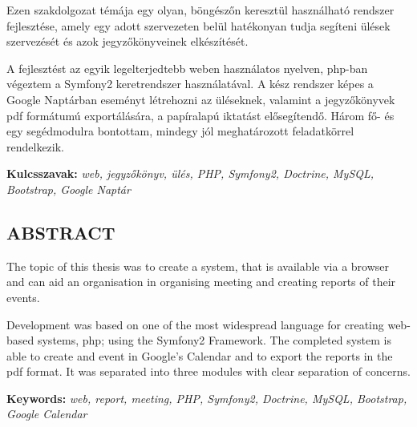 \documentclass[a4paper,12pt,oneside]{report}
\begin{document}
Ezen szakdolgozat témája egy olyan, böngészőn keresztül használható rendszer fejlesztése, amely egy adott szervezeten belül hatékonyan tudja segíteni ülések szervezését és azok jegyzőkönyveinek elkészítését.

A fejlesztést az egyik legelterjedtebb weben használatos nyelven, php-ban végeztem a Symfony2 keretrendszer használatával. A kész rendszer képes a Google Naptárban eseményt létrehozni az üléseknek, valamint a jegyzőkönyvek pdf formátumú exportálására, a papíralapú iktatást elősegítendő. Három fő- és egy segédmodulra bontottam, mindegy jól meghatározott feladatkörrel rendelkezik.

\vspace{2cm}

{\bf Kulcsszavak:} {\it web, jegyzőkönyv, ülés, PHP, Symfony2, Doctrine, MySQL, Bootstrap, Google Naptár}
\newpage

\newpage

\begin{center}
\section*{\textbf{\Large \MakeUppercase{Abstract}}}
\end{center}

The topic of this thesis was to create a system, that is available via a browser and can aid an organisation in organising meeting and creating reports of their events.

Development was based on one of the most widespread language for creating web-based systems, php; using the Symfony2 Framework. The completed system is able to create and event in Google's Calendar and to export the reports in the pdf format. It was separated into three modules with clear separation of concerns.

\vspace{2cm}

{\bf Keywords:} {\it web, report, meeting, PHP, Symfony2, Doctrine, MySQL, Bootstrap, Google Calendar}
\newpage

\renewcommand{\thefigure}{\arabic{figure}}

\setcounter{tocdepth}{3} %
\thispagestyle{empty}
\tableofcontents
\pagebreak

\setcounter{page}{1} %
\pagestyle{plain}
\fancyhead[C]{\rightmark}
\fancyfoot[R]{\thepage}
\end{document}
